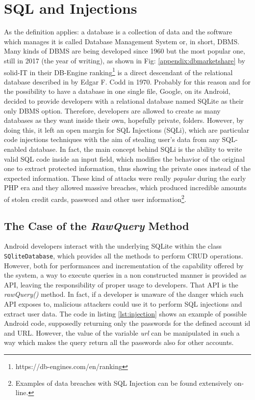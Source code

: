 \section{SQL and Injections}
As the definition applies: a database is a collection of data and the software which manages it is called Database Management System or, in short, DBMS. Many kinds of DBMS are being developed since 1960 but the most popular one, still in 2017 (the year of writing), as shown in Fig: \ref{appendix:dbmarketshare} by solid-IT in their DB-Engine ranking\footnote{https://db-engines.com/en/ranking} is a direct descendant of the relational database described in \cite{dbrelational} by Edgar F. Codd in 1970. Probably for this reason and for the possibility to have a database in one single file, Google, on its Android, decided to provide developers with a relational database named SQLite as their only DBMS option. Therefore, developers are allowed to create as many databases as they want inside their own, hopefully private, folders. However, by doing this, it left an open margin for SQL Injections (SQLi), which are particular code injections techniques with the aim of stealing user's data from any SQL-enabled database. In fact, the main concept behind SQLi is the ability to write valid SQL code inside an input field, which modifies the behavior of the original one to extract protected information, thus showing the private ones instead of the expected information. These kind of attacks were really \emph{popular} during the early PHP era and they allowed massive breaches, which produced incredible amounts of stolen credit cards, password and other user information\footnote{Examples of data breaches with SQL Injection can be found extensively on-line.}. 

\subsection{The Case of the \emph{RawQuery} Method}
Android developers interact with the underlying SQLite within the class \texttt{SQliteDatabase}, which provides all the methods to perform CRUD operations. However, both for performances and incrementation of the capability offered by the system, a way to execute queries in a non constructed manner is provided as API, leaving the responsibility of proper usage to developers. That API is the \emph{rawQuery()} method. In fact, if a developer is unaware of the danger which such API exposes to, malicious attackers could use it to perform SQL injections and extract user data. The code in listing \ref{lst:injection} shows an example of possible Android code, supposedly returning only the passwords for the defined account id and URL. However, the value of the variable \emph{url} can be manipulated in such a way which makes the query return all the passwords also for other accounts.\newline\newline

